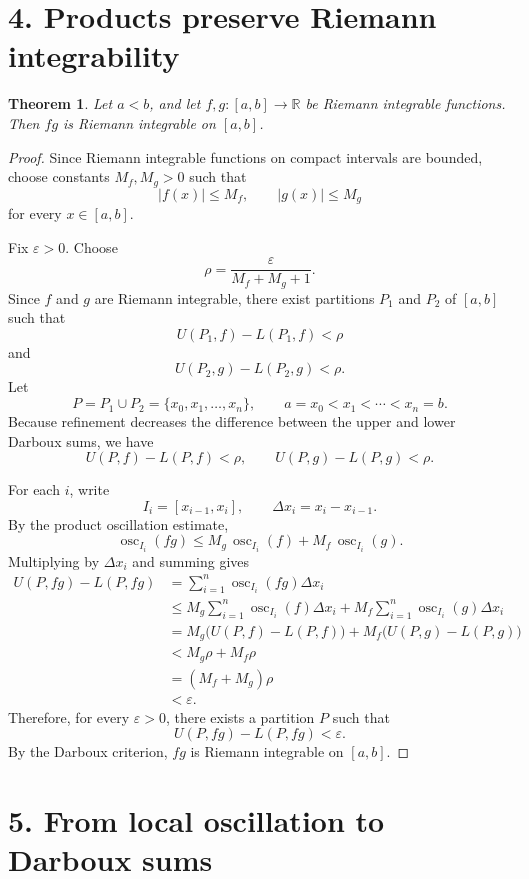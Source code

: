 \documentclass[11pt]{article}
\newcommand{\R}{\mathbb{R}}
\newcommand{\dxi}{\Delta x_i}
\DeclareMathOperator{\osc}{osc}
\theoremstyle{plain}
\newtheorem{theorem}{Theorem}
\theoremstyle{remark}
\begin{document}
\section*{4. Products preserve Riemann integrability}

\begin{theorem}
Let $a<b$, and let $f,g:[a,b]\to\R$ be Riemann integrable functions. Then $fg$ is Riemann integrable on $[a,b]$.
\end{theorem}

\begin{proof}
Since Riemann integrable functions on compact intervals are bounded, choose constants $M_f,M_g>0$ such that
\[
    |f(x)|\leq M_f,
    \qquad
    |g(x)|\leq M_g
\]
for every $x\in [a,b]$.

Fix $\varepsilon>0$. Choose
\[
    \rho=\frac{\varepsilon}{M_f+M_g+1}.
\]
Since $f$ and $g$ are Riemann integrable, there exist partitions $P_1$ and $P_2$ of $[a,b]$ such that
\[
    U(P_1,f)-L(P_1,f)<\rho
\]
and
\[
    U(P_2,g)-L(P_2,g)<\rho.
\]
Let
\[
    P=P_1\cup P_2=\{x_0,x_1,\dots,x_n\},
    \qquad
    a=x_0<x_1<\cdots <x_n=b.
\]
Because refinement decreases the difference between the upper and lower Darboux sums, we have
\[
    U(P,f)-L(P,f)<\rho,
    \qquad
    U(P,g)-L(P,g)<\rho.
\]

For each $i$, write
\[
    I_i=[x_{i-1},x_i],
    \qquad
    \dxi=x_i-x_{i-1}.
\]
By the product oscillation estimate,
\[
    \osc_{I_i}(fg)
    \leq
    M_g\,\osc_{I_i}(f)+M_f\,\osc_{I_i}(g).
\]
Multiplying by $\dxi$ and summing gives
\begin{align*}
    U(P,fg)-L(P,fg)
    &=\sum_{i=1}^n \osc_{I_i}(fg)\dxi\\
    &\leq
    M_g\sum_{i=1}^n \osc_{I_i}(f)\dxi
    +M_f\sum_{i=1}^n \osc_{I_i}(g)\dxi\\
    &=M_g\bigl(U(P,f)-L(P,f)\bigr)
    +M_f\bigl(U(P,g)-L(P,g)\bigr)\\
    &<M_g\rho+M_f\rho\\
    &=(M_f+M_g)\rho\\
    &<\varepsilon.
\end{align*}
Therefore, for every $\varepsilon>0$, there exists a partition $P$ such that
\[
    U(P,fg)-L(P,fg)<\varepsilon.
\]
By the Darboux criterion, $fg$ is Riemann integrable on $[a,b]$.
\end{proof}

\section*{5. From local oscillation to Darboux sums}
\end{document}

